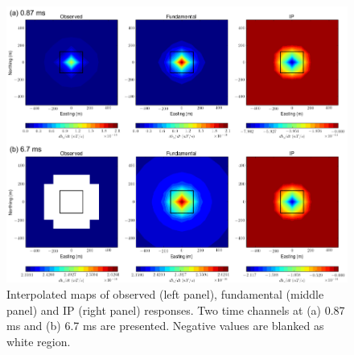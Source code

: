 \documentclass[a4paper, 11pt]{article}
\begin{document}
\begin{figure}[htb]
  \centering
  \includegraphics[width=1.\textwidth]{figures/IPresp_Plan.png}
  \caption{Interpolated maps of observed (left panel), fundamental (middle panel) and IP (right panel) responses. Two time channels at (a) 0.87 ms and (b) 6.7 ms are presented. 
  Negative values are blanked as white region.
  }
  \label{F:IPresp_Plan}
\end{figure}
\clearpage

\end{document}

